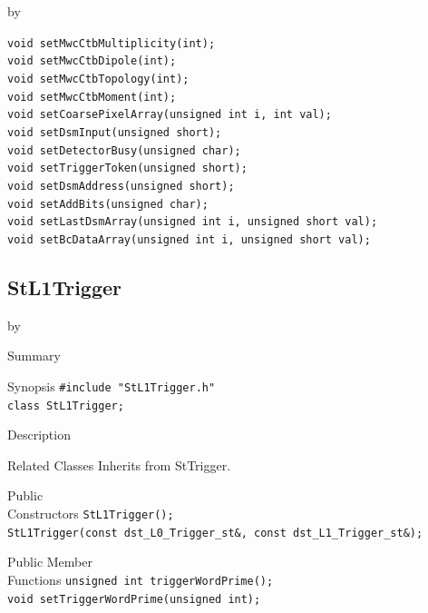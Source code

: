 \documentclass[twoside]{article}
\newcommand{\entrylabel}[1]{\mbox{\textbf{{#1}}}\hfil}%
\newenvironment{entry}
{\begin{list}{}%
    {\renewcommand{\makelabel}{\entrylabel}%
     \setlength{\labelwidth}{90pt}%
     \setlength{\leftmargin}{\labelwidth}
     \advance\leftmargin by \labelsep%
      }%
    }%
  {\end{list}}
\newcommand{\Entrylabel}[1]%
{\raisebox{0pt}[1ex][0pt]{\makebox[\labelwidth][l]%
    {\parbox[t]{\labelwidth}{\hspace{0pt}\textbf{{#1}}}}}}
\newenvironment{Entry}%
{\renewcommand{\entrylabel}{\Entrylabel}\begin{entry}}%
  {\end{entry}}
\begin{document}
\begin{Entry}
    \verb+void setMwcCtbMultiplicity(int);+\\
    \verb+void setMwcCtbDipole(int);+\\
    \verb+void setMwcCtbTopology(int);+\\
    \verb+void setMwcCtbMoment(int);+\\
    \verb+void setCoarsePixelArray(unsigned int i, int val);+\\
    \verb+void setDsmInput(unsigned short);+\\
    \verb+void setDetectorBusy(unsigned char);+\\ 
    \verb+void setTriggerToken(unsigned short);+\\
    \verb+void setDsmAddress(unsigned short); +\\ 
    \verb+void setAddBits(unsigned char); +\\  
    \verb+void setLastDsmArray(unsigned int i, unsigned short val);+\\
    \verb+void setBcDataArray(unsigned int i, unsigned short val);+\\
\end{Entry}
\clearpage

\subsection{StL1Trigger}
\label{sec:StL1Trigger}
\begin{Entry}
\item[Summary]
\item[Synopsis]
    \verb+#include "StL1Trigger.h"+\\
    \verb+class StL1Trigger;+\\
\item[Description]
\item[Related Classes]
    Inherits from StTrigger.
\item[Public\\ Constructors]
    \verb+StL1Trigger();+\\
    \verb+StL1Trigger(const dst_L0_Trigger_st&, const dst_L1_Trigger_st&);+\\
\item[Public Member\\ Functions]
    \verb+unsigned int triggerWordPrime();+\\
    
    \verb+void setTriggerWordPrime(unsigned int);+\\
\end{Entry}
\clearpage
\end{document}
